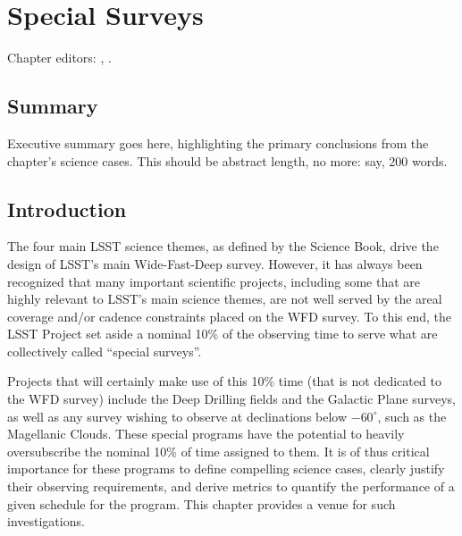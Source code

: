 \chapter[Special Surveys]{Special Surveys}
\def\chpname{specialsurveys}\label{chp:\chpname}

Chapter editors:
,
.



\section*{Summary}

Executive summary goes here, highlighting the primary conclusions from
the chapter's science cases. This should be abstract length, no more:
say, 200 words.


\section{Introduction}
\label{sec:specials:intro}

The four main LSST science themes, as defined by the Science Book,
drive the design of LSST's main Wide-Fast-Deep survey.  However, it
has always been recognized that many important scientific projects,
including some that are highly relevant to LSST's main science themes,
are not well served by the areal coverage and/or cadence constraints
placed on the WFD survey.  To this end, the LSST Project set aside a
nominal 10\% of the observing time to serve what are collectively
called ``special surveys''.

Projects that
will certainly make use of this 10\% time (that is not dedicated to the WFD
survey) include the Deep Drilling fields and the Galactic Plane surveys,
as well as any survey wishing to
observe at declinations below $-60^\circ$, such as the Magellanic
Clouds.  These special programs have the potential to
heavily oversubscribe the nominal 10\%
of time assigned to them.  It is of thus critical importance for these
programs to define compelling science cases, clearly justify their
observing requirements, and derive metrics to quantify the performance
of a given schedule for the program. This chapter provides a venue for
such investigations.

